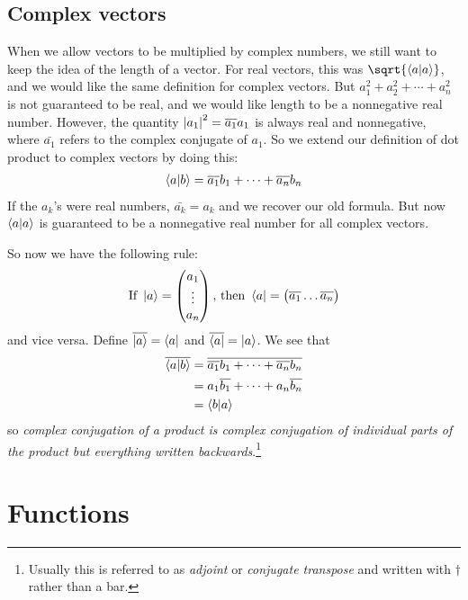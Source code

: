 \documentclass[12pt, oneside, letterpaper, fleqn]{article}
\begin{document}
\subsection{Complex vectors}
When we allow vectors to be multiplied by complex numbers, we still want
to keep the idea of the length of a vector. For real vectors, this was
$\sqrt{\braket{a}{a}}$, and we would like the same definition for
complex vectors. But $a_1^2 + a_2^2 + \dotsb + a_n^2$ is not guaranteed
to be real, and we would like length to be a nonnegative real number.
However, the quantity $\left\lvert a_1 \right\rvert^2 = \overline{a_1}a_1$ is always real and
nonnegative, where $\bar{a_1}$ refers to the complex conjugate of $a_1$. So
we extend our definition of dot product to complex vectors by doing
this:
\begin{align}
\left\langle a\middle\vert b\right\rangle = \overline{a_1}b_1 + \dotsb + \overline{a_n}b_n
\end{align}
If the $a_k$'s were real numbers, $\bar{a_k} = a_k$ and we recover our
old formula. But now $\left\langle a\middle\vert a\right\rangle$ is guaranteed to be a nonnegative
real number for all complex vectors.

So now we have the following rule:
\begin{align}
\begin{split}
\text{If }\left\lvert a\right\rangle = \begin{pmatrix}a_1\\
\vdots\\
a_n\end{pmatrix}
\text{, then }\left\langle a\right\rvert = \begin{pmatrix}\overline{a_1} \hdots
\overline{a_n}\end{pmatrix}
\end{split}
\end{align}
and vice versa. Define $\overline{\left\lvert a\right\rangle} = \left\langle a\right\rvert$ and $\overline{\left\langle a\right\rvert} =
\left\lvert a\right\rangle$. We see that
\begin{align}
\begin{split}
\overline{\left\langle a\middle\vert b\right\rangle} &= \overline{\overline{a_1}b_1 + \dotsb +
\overline{a_n}b_n}\\
&= a_1\overline{b_1} + \dotsb + a_n\overline{b_n}\\
&= \left\langle b\middle\vert a\right\rangle
\end{split}
\end{align}
so \emph{complex conjugation of a product is complex conjugation of
individual parts of the product but everything written
backwards}.\footnote{Usually this is referred to as \emph{adjoint} or
\emph{conjugate transpose} and written with $\dagger$ rather than a
bar.}

\section{Functions}
\end{document}
